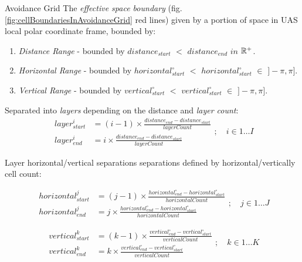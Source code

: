 \begin{definition}{Avoidance Grid}\label{def:AvoidanceGrid} The \emph{effective space boundary} (fig. \ref{fig:cellBoundariesInAvoidanceGrid} red lines) given by a portion of space in UAS local polar coordinate frame, bounded by:
    \begin{enumerate}
        \item \emph{Distance Range} -  bounded by $distance_{start}$ $<$ $distance_{end}$ $in$ $\mathbb{R}^+$.
        \item \emph{Horizontal Range} - bounded by $horizontal^\circ_{start}$ $<$ $horizontal^\circ_{start}$ $\in$ $]-\pi,\pi]$.
        \item \emph{Vertical Range} - bounded by $vertical^\circ_{start}$ $<$ $vertical^\circ_{start}$ $\in$ $]-\pi,\pi]$.
    \end{enumerate}

\noindent Separated into \emph{layers} depending on the distance and \emph{layer count}:
\begin{equation}\label{eq:avoidanceGridCellDistanceRange}
    \begin{aligned}
        layer^i_{start} & = (i-1)\times\frac{distance_{end}-distance_{start}}{layer Count}\\
        layer^i_{end} & = i\times\frac{distance_{end}-distance_{start}}{layer Count}
    \end{aligned};\quad i\in 1\dots I
\end{equation}

\noindent Layer horizontal/vertical separations separations defined by horizontal/vertically cell count:

\begin{equation}\label{eq:avoidanceGridCellHorizontalRange}
    \begin{aligned}
        horizontal^j_{start} & = (j-1)\times\frac{horizontal^\circ_{end}-horizontal^\circ_{start}}{horizontal Count}\\
        horizontal^j_{end} & = j\times\frac{horizontal^\circ_{end}-horizontal^\circ_{start}}{horizontal Count}
    \end{aligned};\quad j\in 1\dots J
\end{equation}

\begin{equation}\label{eq:avoidanceGridCellVerticalRange}
    \begin{aligned}
        vertical^k_{start} & = (k-1)\times\frac{vertical^\circ_{end}-vertical^\circ_{start}}{vertical Count}\\
        vertical^k_{end} & = k\times\frac{vertical^\circ_{end}-vertical^\circ_{start}}{vertical Count}
    \end{aligned};\quad k\in 1\dots K
\end{equation}


\end{definition}
